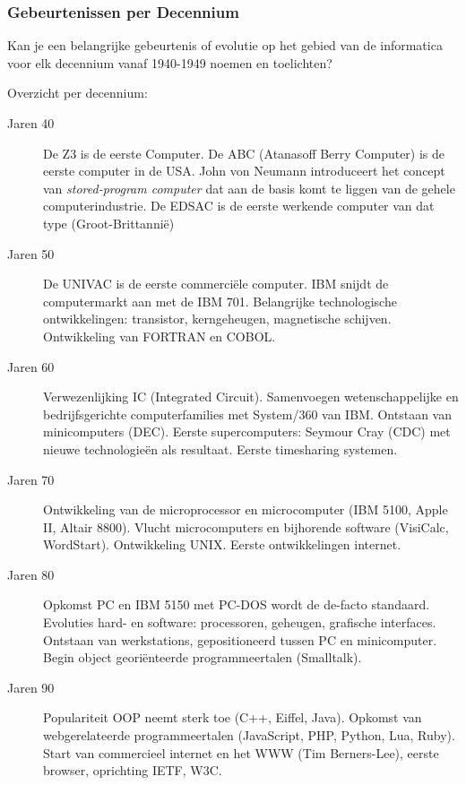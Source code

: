 \documentclass[../main.tex]{subfiles}
\begin{document}
\subsubsection{Gebeurtenissen per Decennium}
\begin{question}
Kan je een belangrijke gebeurtenis of evolutie op het gebied van de informatica voor elk decennium vanaf 1940-1949 noemen en toelichten?
\end{question}
\begin{solution}
Overzicht per decennium:
\begin{description}
	\item[Jaren 40] De Z3 is de eerste Computer. De ABC (Atanasoff Berry Computer) is de eerste computer in de USA. John von Neumann introduceert het concept van \emph{stored-program computer} dat aan de basis komt te liggen van de gehele computerindustrie. De EDSAC is de eerste werkende computer van dat type (Groot-Brittanni\"e)
	\item[Jaren 50] De UNIVAC is de eerste commerci\"ele computer. IBM snijdt de computermarkt aan met de IBM 701. Belangrijke technologische ontwikkelingen: transistor, kerngeheugen, magnetische schijven. Ontwikkeling van FORTRAN en COBOL.
	\item[Jaren 60] Verwezenlijking IC (Integrated Circuit). Samenvoegen wetenschappelijke en bedrijfsgerichte computerfamilies met System/360 van IBM. Ontstaan van minicomputers (DEC). Eerste supercomputers: Seymour Cray (CDC) met nieuwe technologie\"en als resultaat. Eerste timesharing systemen.
	\item[Jaren 70] Ontwikkeling van de microprocessor en microcomputer (IBM 5100, Apple II, Altair 8800). Vlucht microcomputers en bijhorende software (VisiCalc, WordStart). Ontwikkeling UNIX. Eerste ontwikkelingen internet.
	\item[Jaren 80] Opkomst PC en IBM 5150 met PC-DOS wordt de de-facto standaard. Evoluties hard- en software: processoren, geheugen, grafische interfaces. Ontstaan van werkstations, gepositioneerd tussen PC en minicomputer. Begin object geori\"enteerde programmeertalen (Smalltalk).
	\item[Jaren 90] Populariteit OOP neemt sterk toe (C++, Eiffel, Java). Opkomst van webgerelateerde programmeertalen (JavaScript, PHP, Python, Lua, Ruby). Start van commercieel internet en het WWW (Tim Berners-Lee), eerste browser, oprichting IETF, W3C.
\end{description}
\end{solution}
\end{document}
